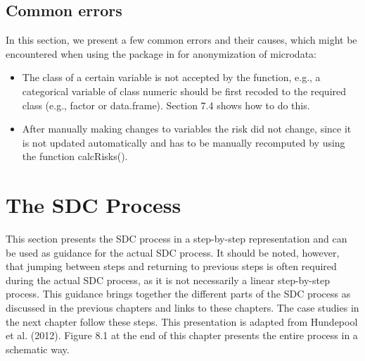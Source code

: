 \documentclass[letterpaper,10pt,english]{sphinxmanual}
\begin{document}
\section{Common errors}
\label{\detokenize{sdcMicro:common-errors}}
In this section, we present a few common errors and their causes, which
might be encountered when using the  package in  for
anonymization of microdata:
\begin{itemize}
\item {} 
The class of a certain variable is not accepted by the function,
e.g., a categorical variable of class numeric should be first recoded
to the required class (e.g., factor or data.frame). Section 7.4 shows
how to do this.

\item {} 
After manually making changes to variables the risk did not change,
since it is not updated automatically and has to be manually
recomputed by using the function calcRisks().

\end{itemize}


\chapter{The SDC Process}
\label{\detokenize{process:the-sdc-process}}\label{\detokenize{process::doc}}
This section presents the SDC process in a step-by-step representation
and can be used as guidance for the actual SDC process. It should be
noted, however, that jumping between steps and returning to previous
steps is often required during the actual SDC process, as it is not
necessarily a linear step-by-step process. This guidance brings together
the different parts of the SDC process as discussed in the previous
chapters and links to these chapters. The case studies in the next
chapter follow these steps. This presentation is adapted from Hundepool
et al. (2012). Figure 8.1 at the end of this chapter presents the entire
process in a schematic way.
\end{document}
